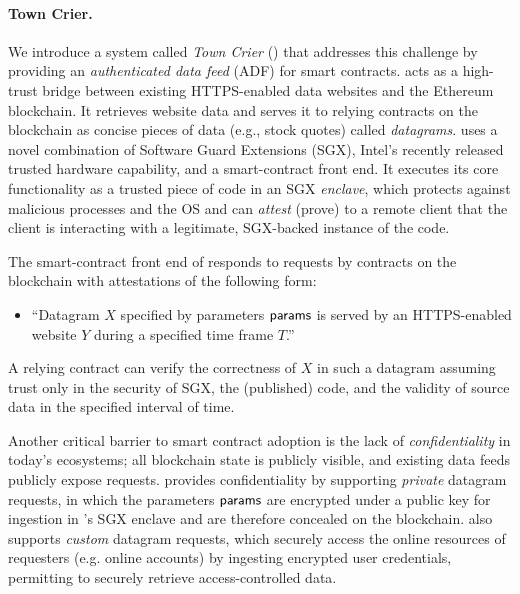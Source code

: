 \paragraph{\bf Town Crier.} We introduce a system called \emph{Town Crier} (\tc) that addresses this challenge by providing an \emph{authenticated data feed} (ADF) for smart contracts. \tc acts as a high-trust bridge between existing HTTPS-enabled data websites and the Ethereum blockchain. It retrieves website data and serves it to relying contracts on the blockchain as concise pieces of data (e.g., stock quotes) called \emph{datagrams}. \tc uses a novel combination of Software Guard Extensions (SGX), Intel's recently released trusted hardware capability, and a smart-contract front end. It executes its core functionality as a trusted piece of code in an SGX \emph{enclave}, which protects against malicious processes and the OS and can \emph{attest} (prove) to a remote client that the client is interacting with a legitimate, SGX-backed instance of the \tc code. 

The smart-contract front end of \tcs responds to requests by contracts on the blockchain with attestations of the following form:

\vspace{-1ex}
\begin{itemize}[leftmargin=3mm]
  \item[] {``Datagram $X$ specified by parameters ${\sf params}$ is served by an HTTPS-enabled website $Y$ during a specified time frame $T$.''}
\end{itemize}
\vspace{-1ex}

\noindent A relying contract can verify the correctness of $X$ in such a datagram assuming trust only in the security of SGX, the (published) \tc code, and the validity of source data in the specified interval of time. 

Another critical barrier to smart contract adoption is the lack of {\em confidentiality} in today's ecosystems; all blockchain state is publicly visible, and existing data feeds publicly expose requests. \tc provides confidentiality by supporting {\em private} datagram requests, in which the parameters ${\sf params}$ are encrypted under a \tc public key for ingestion in \tc's SGX enclave and are therefore concealed on the blockchain. \tc also supports {\em custom} datagram requests, which securely access the online resources of requesters (e.g. online accounts) by ingesting encrypted user credentials, permitting \tc to securely retrieve access-controlled data.

